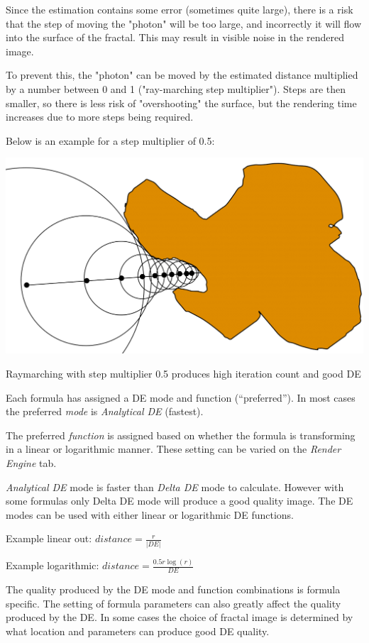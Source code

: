 Since the estimation contains some error (sometimes quite large), there is a
risk that the step of moving the "photon" will be too large, and incorrectly it
will flow into the surface of the fractal. This may result in visible noise in
the rendered image.

To prevent this, the "photon" can be moved by the estimated distance multiplied
by a number between 0 and 1 ("ray-marching step multiplier"). Steps are then
smaller, so there is less risk of "overshooting" the surface, but the rendering
time increases due to more steps being required.

Below is an example for a step multiplier of 0.5:
\nopagebreak

\includegraphics[width=0.7\linewidth]{img/manual/media/distance_estimation_defactor_05}

Raymarching with step multiplier 0.5 produces high iteration count and good DE

Each formula has assigned a DE mode and function (``preferred''). In most cases
the preferred \emph{mode} is \emph{Analytical DE} (fastest).

The preferred \emph{function} is assigned based on whether the formula is
transforming in a linear or logarithmic manner. These setting can be varied on
the \emph{Render Engine} tab.

\emph{Analytical DE} mode is faster than \emph{Delta DE} mode to calculate.
However with some formulas only Delta DE mode will produce a good quality image.
The DE modes can be used with either linear or logarithmic DE functions.

Example linear out: $ distance = \frac{r}{\lvert DE \rvert} $

Example logarithmic: $ distance = \frac{0.5 r  \log(r)}{DE} $

The quality produced by the DE mode and function combinations is formula
specific. The setting of formula parameters can also greatly affect the quality
produced by the DE. In some cases the choice of fractal image is determined by
what location and parameters can produce good DE quality.

